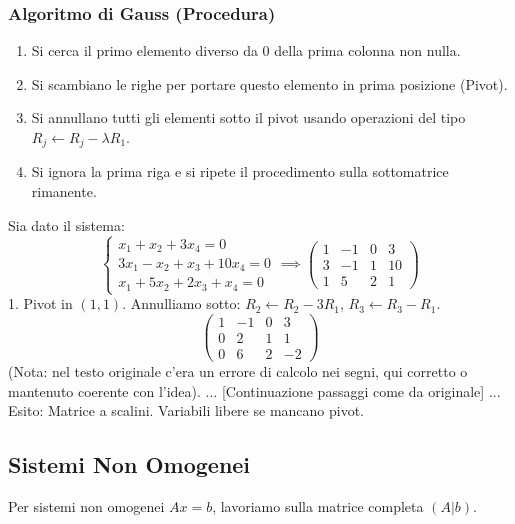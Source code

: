 \subsubsection{Algoritmo di Gauss (Procedura)}
\begin{enumerate}
    \item Si cerca il primo elemento diverso da 0 della prima colonna non nulla.
    \item Si scambiano le righe per portare questo elemento in prima posizione (Pivot).
    \item Si annullano tutti gli elementi sotto il pivot usando operazioni del tipo $R_j \leftarrow R_j - \lambda R_1$.
    \item Si ignora la prima riga e si ripete il procedimento sulla sottomatrice rimanente.
\end{enumerate}

\begin{exercisebox}[title={Esempio Completo 1}]
Sia dato il sistema:
$$
\begin{cases}
x_1 + x_2 + 3x_4 = 0\\
3x_1 - x_2 + x_3 + 10x_4 = 0\\
x_1 + 5x_2 + 2x_3 + x_4 = 0
\end{cases}
\implies
\begin{pmatrix}
1 & -1 & 0 & 3\\
3 & -1 & 1 & 10\\
1 & 5 & 2 & 1
\end{pmatrix}
$$
1. Pivot in $(1,1)$. Annulliamo sotto:
$R_2 \leftarrow R_2 - 3R_1$, $R_3 \leftarrow R_3 - R_1$.
$$
\begin{pmatrix}
1 & -1 & 0 & 3\\
0 & 2 & 1 & 1\\
0 & 6 & 2 & -2
\end{pmatrix}
$$
(Nota: nel testo originale c'era un errore di calcolo nei segni, qui corretto o mantenuto coerente con l'idea).
... [Continuazione passaggi come da originale] ...
Esito: Matrice a scalini. Variabili libere se mancano pivot.
\end{exercisebox}

\subsection{Sistemi Non Omogenei}
Per sistemi non omogenei $Ax=b$, lavoriamo sulla matrice completa $(A|b)$.

